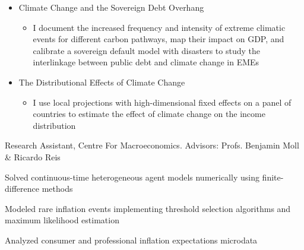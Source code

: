 \documentclass{practical-resume}
\begin{document}
\vspace{-0.5em}
	\begin{itemize}
		\item Climate Change and the Sovereign Debt Overhang\vspace{-0.25em}
		\begin{itemize}\vspace{-0.5em}
			\item I document the increased frequency and intensity of extreme climatic events for different carbon pathways, map their impact on GDP, and calibrate a sovereign default model with disasters to study the interlinkage between public debt and climate change in EMEs
		\vspace{-0.75em}
		\end{itemize}
		\item The Distributional Effects of Climate Change\vspace{-0.26em}
		\begin{itemize}\vspace{-0.5em}	
			\item I use local projections with high-dimensional fixed effects on a panel of countries to estimate the effect of climate change on the income distribution
		\end{itemize}
	\end{itemize}\vspace{-1em}




	\begin{position}{Research Assistant, }{Centre For Macroeconomics. Advisors: Profs. Benjamin Moll \& Ricardo Reis}	
		\item Solved continuous-time heterogeneous agent models numerically using finite-difference methods
			\item Modeled rare inflation events implementing threshold selection algorithms and maximum likelihood estimation
			\item Analyzed consumer and professional inflation expectations microdata
	\end{position}
\end{document}
